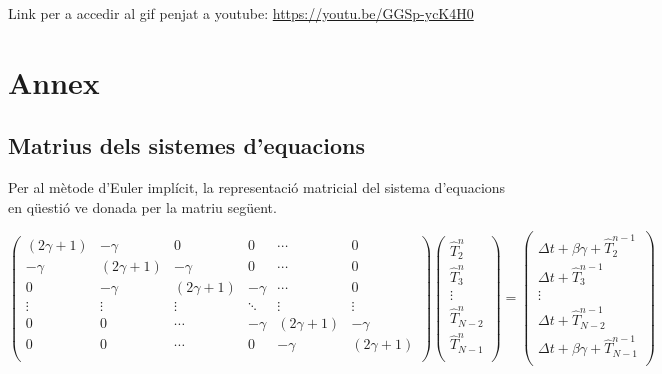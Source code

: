 \documentclass[11pt]{article}
\begin{document}
Link per a accedir al gif penjat a youtube: \url{https://youtu.be/GGSp-ycK4H0}

\section{Annex}

\subsection{Matrius dels sistemes d'equacions} \label{subsec: matrius}

Per al mètode d'Euler implícit, la representació matricial del sistema d'equacions en qüestió ve donada per la matriu següent.

\begin{equation}
  \begin{pmatrix}
    (2\gamma + {1}) & {-\gamma} & {0} & {0} & \cdots & {0} \\
    {-\gamma} & (2\gamma + {1}) & {-\gamma} & {0} & \cdots & {0} \\
    {0} & {-\gamma} & (2\gamma + {1}) & {-\gamma} & \cdots & {0} \\
    \vdots & \vdots & \vdots & \ddots & \vdots & \vdots \\
    {0} & {0} & \cdots & {-\gamma} & (2\gamma + {1}) & {-\gamma} \\
    {0} & {0} & \cdots & {0} & {-\gamma} & (2\gamma + {1}) \\
  \end{pmatrix}
  \begin{pmatrix}
    \hat{T}_{2}^{n} \\
    \hat{T}_{3}^{n} \\
    \vdots \\
    \hat{T}_{N-2}^{n} \\
    \hat{T}_{N-1}^{n} \\
  \end{pmatrix}
  =
  \begin{pmatrix}
    \Delta t + \beta\gamma + \hat{T}^{n-1}_2 \\
    \Delta t + \hat{T}^{n-1}_3 \\
    \vdots \\
    \Delta t + \hat{T}^{n-1}_{N-2} \\
    \Delta t + \beta\gamma + \hat{T}^{n-1}_{N-1} \\
  \end{pmatrix}
  \label{matriu implicit}
\end{equation}
\end{document}
